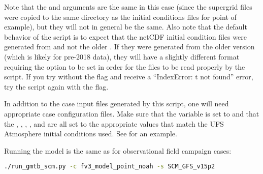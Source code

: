 Note that the  and  arguments are the same in this case (since the supergrid files were copied to the same directory as the initial conditions files for point of example), but they will not in general be the same. Also note that the default behavior of the script is to expect that the netCDF initial condition files were generated from  and not the older . If they were generated from the older version (which is likely for pre-2018 data), they will have a slightly different format requiring the  option to be set in order for the files to be read properly by the script. If you try without the  flag and receive a ``IndexError: t not found'' error, try the script again with the flag.

In addition to the case input files generated by this script, one will need appropriate case configuration files. Make sure that the  variable is set to  and that the , , , , and  are all set to the appropriate values that match the UFS Atmosphere initial conditions used. See  for an example.

Running the model is the same as for observational field campaign cases:
\begin{lstlisting}[language=bash]
./run_gmtb_scm.py -c fv3_model_point_noah -s SCM_GFS_v15p2
\end{lstlisting}
